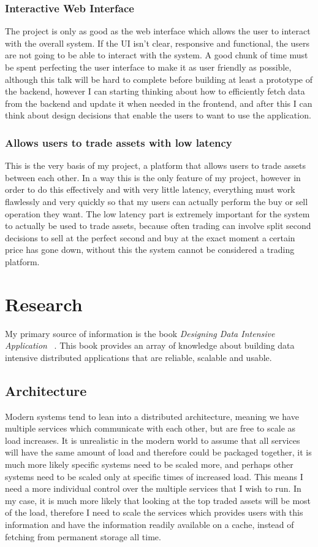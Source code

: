 \documentclass[titlepage]{article}
\begin{document}
\subsubsection{Interactive Web Interface}
The project is only as good as the web interface which allows the user to interact with the overall system. If the UI isn't clear, responsive and functional, the users are not going to be able to interact with the system. A good chunk of time must be spent perfecting the user interface to make it as user friendly as possible, although this talk will be hard to complete before building at least a prototype of the backend, however I can starting thinking about how to efficiently fetch data from the backend and update it when needed in the frontend, and after this I can think about design decisions that enable the users to want to use the application.

\subsubsection{Allows users to trade assets with low latency}
This is the very basis of my project, a platform that allows users to trade assets between each other. In a way this is the only feature of my project, however in order to do this effectively and with very little latency, everything must work flawlessly and very quickly so that my users can actually perform the buy or sell operation they want. The low latency part is extremely important for the system to actually be used to trade assets, because often trading can involve split second decisions to sell at the perfect second and buy at the exact moment a certain price has gone down, without this the system cannot be considered a trading platform.

\section{Research}
My primary source of information is the book \textit{Designing Data Intensive Application} ~\cite{kleppmann_2021}. This book provides an array of knowledge about building data intensive distributed applications that are reliable, scalable and usable.

\subsection{Architecture}
Modern systems tend to lean into a distributed architecture, meaning we have multiple services which communicate with each other, but are free to scale as load increases. It is unrealistic in the modern world to assume that all services will have the same amount of load and therefore could be packaged together, it is much more likely specific systems need to be scaled more, and perhaps other systems need to be scaled only at specific times of increased load. This means I need a more individual control over the multiple services that I wish to run. In my case, it is much more likely that looking at the top traded assets will be most of the load, therefore I need to scale the services which provides users with this information and have the information readily available on a cache, instead of fetching from permanent storage all time. 
\end{document}
